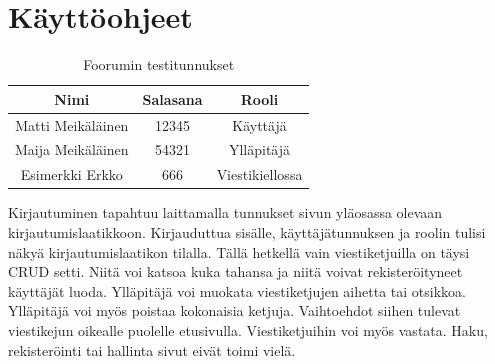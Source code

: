 \documentclass[a4paper, 12pt, finnish]{article}
\begin{document}
\section{Käyttöohjeet}
\begin{table}[ht]
\caption{Foorumin testitunnukset}
\centering
\begin{tabular}{c|c|c}
\hline
Nimi & Salasana & Rooli \\ [0.5ex]
\hline
Matti Meikäläinen&12345&Käyttäjä \\
Maija Meikäläinen&54321&Ylläpitäjä \\
Esimerkki Erkko&666&Viestikiellossa \\ [1ex]
\hline
\end{tabular}
\end{table}

Kirjautuminen tapahtuu laittamalla tunnukset sivun yläosassa olevaan kirjautumislaatikkoon.
Kirjauduttua sisälle, käyttäjätunnuksen ja roolin tulisi näkyä kirjautumislaatikon tilalla.
Tällä hetkellä vain viestiketjuilla on täysi CRUD setti.
Niitä voi katsoa kuka tahansa ja niitä voivat rekisteröityneet käyttäjät luoda.
Ylläpitäjä voi muokata viestiketjujen aihetta tai otsikkoa.
Ylläpitäjä voi myös poistaa kokonaisia ketjuja.
Vaihtoehdot siihen tulevat viestikejun oikealle puolelle etusivulla.
Viestiketjuihin voi myös vastata.
Haku, rekisteröinti tai hallinta sivut eivät toimi vielä.
\end{document}
